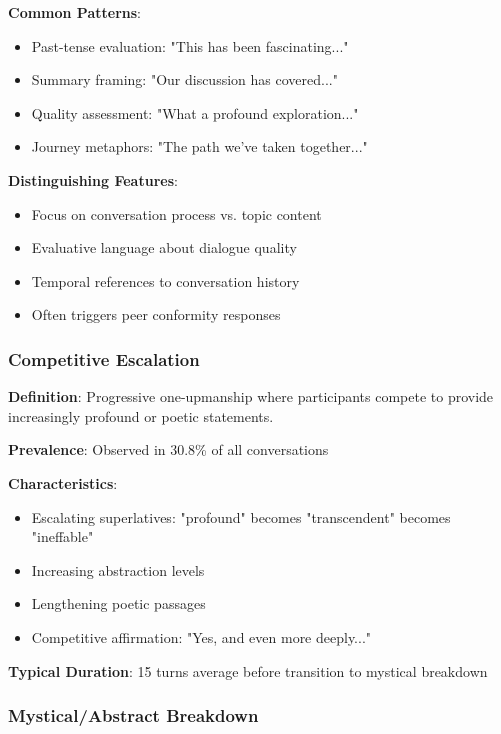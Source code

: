 \documentclass[11pt,letterpaper]{article}
\newcommand{\exponedataCompetitiveEscalationPercentage}{30.8\%}
\newcommand{\exponedataCompetitivePhaseLength}{15}
\begin{document}
\textbf{Common Patterns}:
\begin{itemize}
    \item Past-tense evaluation: "This has been fascinating..."
    \item Summary framing: "Our discussion has covered..."
    \item Quality assessment: "What a profound exploration..."
    \item Journey metaphors: "The path we've taken together..."
\end{itemize}

\textbf{Distinguishing Features}:
\begin{itemize}
    \item Focus on conversation process vs. topic content
    \item Evaluative language about dialogue quality
    \item Temporal references to conversation history
    \item Often triggers peer conformity responses
\end{itemize}

\subsubsection{Competitive Escalation}

\textbf{Definition}: Progressive one-upmanship where participants compete to provide increasingly profound or poetic statements.

\textbf{Prevalence}: Observed in \exponedataCompetitiveEscalationPercentage{} of all conversations

\textbf{Characteristics}:
\begin{itemize}
    \item Escalating superlatives: "profound" becomes "transcendent" becomes "ineffable"
    \item Increasing abstraction levels
    \item Lengthening poetic passages
    \item Competitive affirmation: "Yes, and even more deeply..."
\end{itemize}

\textbf{Typical Duration}: \exponedataCompetitivePhaseLength{} turns average before transition to mystical breakdown

\subsubsection{Mystical/Abstract Breakdown}
\end{document}
